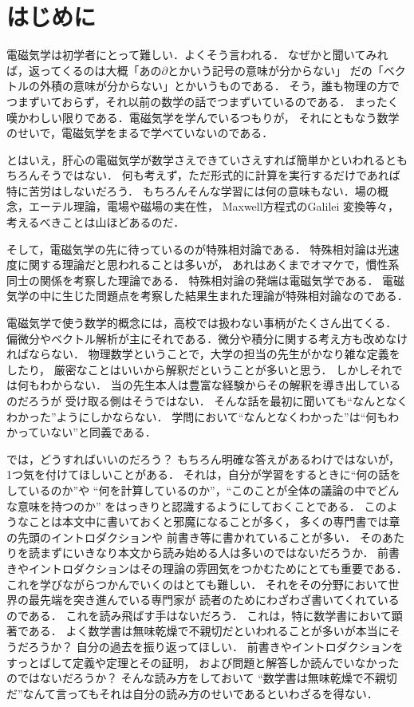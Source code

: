﻿\chapter{はじめに}
電磁気学は初学者にとって難しい．よくそう言われる．
なぜかと聞いてみれば，返ってくるのは大概「あの$\partial$とかいう記号の意味が分からない」
だの「ベクトルの外積の意味が分からない」とかいうものである．
そう，誰も物理の方でつまずいておらず，それ以前の数学の話でつまずいているのである．
まったく嘆かわしい限りである．電磁気学を学んでいるつもりが，
それにともなう数学のせいで，電磁気学をまるで学べていないのである．

とはいえ，肝心の電磁気学が数学さえできていさえすれば簡単かといわれるともちろんそうではない．
何も考えず，ただ形式的に計算を実行するだけであれば特に苦労はしないだろう．
もちろんそんな学習には何の意味もない．場の概念，エーテル理論，電場や磁場の実在性，
Maxwell方程式のGalilei
変換等々，考えるべきことは山ほどあるのだ．

そして，電磁気学の先に待っているのが特殊相対論である．
特殊相対論は光速度に関する理論だと思われることは多いが，
あれはあくまでオマケで，慣性系同士の関係を考察した理論である．
特殊相対論の発端は電磁気学である．
電磁気学の中に生じた問題点を考察した結果生まれた理論が特殊相対論なのである．

電磁気学で使う数学的概念には，高校では扱わない事柄がたくさん出てくる．
偏微分やベクトル解析が主にそれである．微分や積分に関する考え方も改めなければならない．
物理数学ということで，大学の担当の先生がかなり雑な定義をしたり，
厳密なことはいいから解釈だということが多いと思う．
しかしそれでは何もわからない．
当の先生本人は豊富な経験からその解釈を導き出しているのだろうが
受け取る側はそうではない．
そんな話を最初に聞いても``なんとなくわかった''ようにしかならない．
学問において``なんとなくわかった''は``何もわかっていない''と同義である．

では，どうすればいいのだろう？ もちろん明確な答えがあるわけではないが，
1つ気を付けてほしいことがある．
それは，自分が学習をするときに``何の話をしているのか''や
``何を計算しているのか''，``このことが全体の議論の中でどんな意味を持つのか''
をはっきりと認識するようにしておくことである．
このようなことは本文中に書いておくと邪魔になることが多く，
多くの専門書では章の先頭のイントロダクションや
前書き等に書かれていることが多い．
そのあたりを読まずにいきなり本文から読み始める人は多いのではないだろうか．
前書きやイントロダクションはその理論の雰囲気をつかむためにとても重要である．
これを学びながらつかんでいくのはとても難しい．
それをその分野において世界の最先端を突き進んでいる専門家が
読者のためにわざわざ書いてくれているのである．
これを読み飛ばす手はないだろう．
これは，特に数学書において顕著である．
よく数学書は無味乾燥で不親切だといわれることが多いが本当にそうだろうか？ 自分の過去を振り返ってほしい．
前書きやイントロダクションをすっとばして定義や定理とその証明，
および問題と解答しか読んでいなかったのではないだろうか？ そんな読み方をしておいて
``数学書は無味乾燥で不親切だ''なんて言ってもそれは自分の読み方のせいであるといわざるを得ない．

